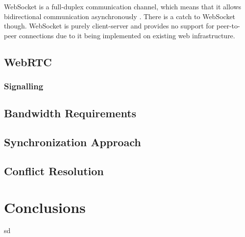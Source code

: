 \documentclass[prodmode,acmtecs]{acmsmall}
\begin{document}
WebSocket is a full-duplex communication channel, which means that it allows bidirectional communication asynchronously \cite{rakhundereal}. There is a catch to WebSocket though. WebSocket is purely client-server and provides no support for peer-to-peer connections due to it being implemented on existing web infrastructure.

\subsection{WebRTC}
\subsubsection*{Signalling}
\subsection{Bandwidth Requirements}
\subsection{Synchronization Approach}
\subsection{Conflict Resolution}


\section{Conclusions}

sd
\appendix


\end{document}
